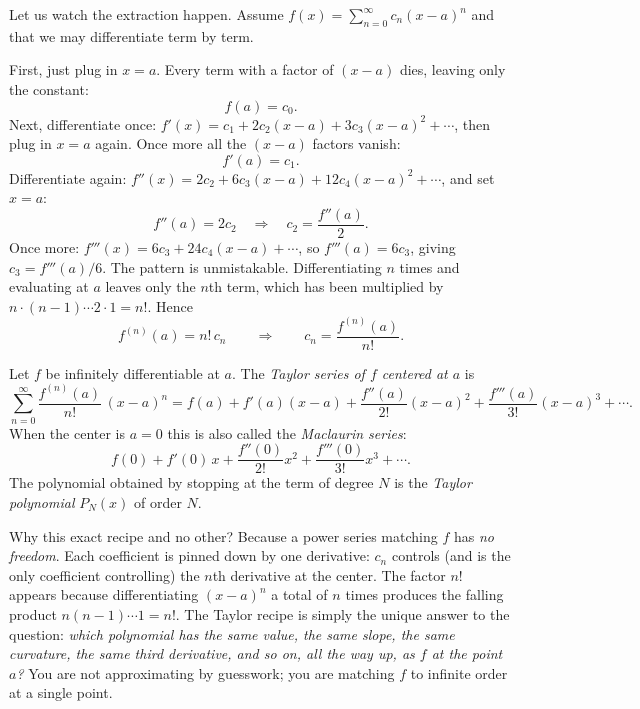 Let us watch the extraction happen. Assume $f(x) = \sum_{n=0}^\infty c_n (x-a)^n$ and that we may differentiate term by term.

First, just plug in $x = a$. Every term with a factor of $(x-a)$ dies, leaving only the constant:
\[
  f(a) = c_0.
\]
Next, differentiate once: $f'(x) = c_1 + 2c_2(x-a) + 3c_3(x-a)^2 + \cdots$, then plug in $x=a$ again. Once more all the $(x-a)$ factors vanish:
\[
  f'(a) = c_1.
\]
Differentiate again: $f''(x) = 2c_2 + 6c_3(x-a) + 12 c_4 (x-a)^2 + \cdots$, and set $x=a$:
\[
  f''(a) = 2c_2 \quad\Longrightarrow\quad c_2 = \frac{f''(a)}{2}.
\]
Once more: $f'''(x) = 6 c_3 + 24 c_4 (x-a) + \cdots$, so $f'''(a) = 6 c_3$, giving $c_3 = f'''(a)/6$. The pattern is unmistakable. Differentiating $n$ times and evaluating at $a$ leaves only the $n$th term, which has been multiplied by $n\cdot(n-1)\cdots 2\cdot 1 = n!$. Hence
\[
  f^{(n)}(a) = n!\, c_n \qquad\Longrightarrow\qquad c_n = \frac{f^{(n)}(a)}{n!}.
\]

\begin{definition}
\label{ch30:def-taylor}
Let $f$ be infinitely differentiable at $a$. The \emph{Taylor series of $f$ centered at $a$} is
\[
  \sum_{n=0}^{\infty} \frac{f^{(n)}(a)}{n!}\,(x-a)^n
  = f(a) + f'(a)(x-a) + \frac{f''(a)}{2!}(x-a)^2 + \frac{f'''(a)}{3!}(x-a)^3 + \cdots.
\]
When the center is $a=0$ this is also called the \emph{Maclaurin series}:
\[
  f(0) + f'(0)\,x + \frac{f''(0)}{2!}x^2 + \frac{f'''(0)}{3!}x^3 + \cdots.
\]
The polynomial obtained by stopping at the term of degree $N$ is the \emph{Taylor polynomial} $P_N(x)$ of order $N$.
\end{definition}

\begin{whybox}
Why this exact recipe and no other? Because a power series matching $f$ has \emph{no freedom}. Each coefficient is pinned down by one derivative: $c_n$ controls (and is the only coefficient controlling) the $n$th derivative at the center. The factor $n!$ appears because differentiating $(x-a)^n$ a total of $n$ times produces the falling product $n(n-1)\cdots 1 = n!$. The Taylor recipe is simply the unique answer to the question: \emph{which polynomial has the same value, the same slope, the same curvature, the same third derivative, and so on, all the way up, as $f$ at the point $a$?} You are not approximating by guesswork; you are matching $f$ to infinite order at a single point.
\end{whybox}

